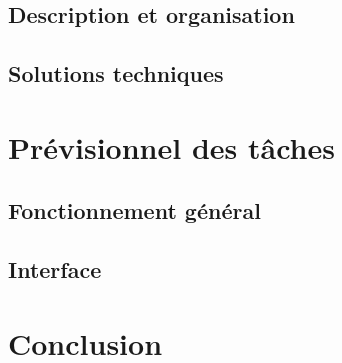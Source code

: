 \documentclass[11pt]{report}
\begin{document}
	\section{Description et organisation}

	\section{Solutions techniques}

\chapter{Prévisionnel des tâches}

	\section{Fonctionnement général}

	\section{Interface}

\chapter{Conclusion}
\end{document}
